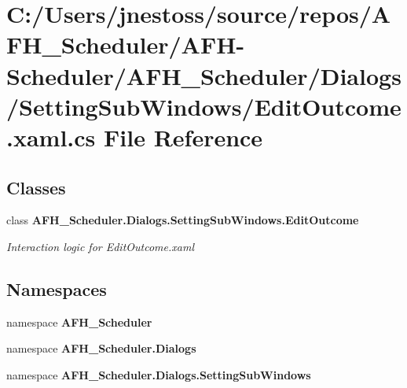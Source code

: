 \section{C\+:/\+Users/jnestoss/source/repos/\+A\+F\+H\+\_\+\+Scheduler/\+A\+F\+H-\/\+Scheduler/\+A\+F\+H\+\_\+\+Scheduler/\+Dialogs/\+Setting\+Sub\+Windows/\+Edit\+Outcome.xaml.\+cs File Reference}
\label{_edit_outcome_8xaml_8cs}
\subsection*{Classes}
\begin{DoxyCompactItemize}
\item 
class \textbf{ A\+F\+H\+\_\+\+Scheduler.\+Dialogs.\+Setting\+Sub\+Windows.\+Edit\+Outcome}
\begin{DoxyCompactList}\small\item\em Interaction logic for Edit\+Outcome.\+xaml \end{DoxyCompactList}\end{DoxyCompactItemize}
\subsection*{Namespaces}
\begin{DoxyCompactItemize}
\item 
namespace \textbf{ A\+F\+H\+\_\+\+Scheduler}
\item 
namespace \textbf{ A\+F\+H\+\_\+\+Scheduler.\+Dialogs}
\item 
namespace \textbf{ A\+F\+H\+\_\+\+Scheduler.\+Dialogs.\+Setting\+Sub\+Windows}
\end{DoxyCompactItemize}
